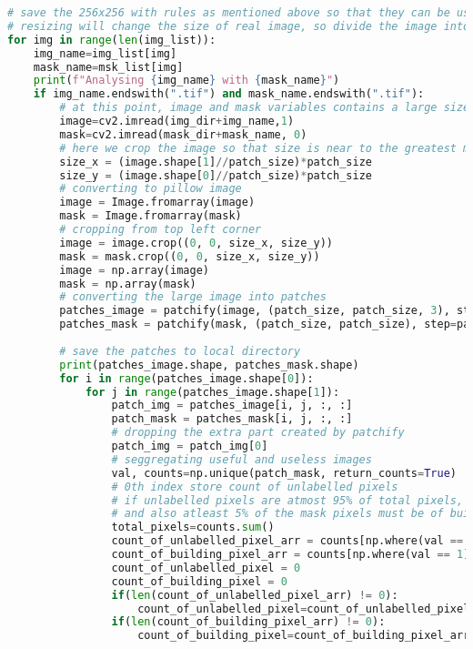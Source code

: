 \begin{lstlisting}[language=Python]
# save the 256x256 with rules as mentioned above so that they can be used for data augumentation
# resizing will change the size of real image, so divide the image into patches of 256x256x3
for img in range(len(img_list)):
    img_name=img_list[img]
    mask_name=msk_list[img]
    print(f"Analysing {img_name} with {mask_name}")
    if img_name.endswith(".tif") and mask_name.endswith(".tif"):
        # at this point, image and mask variables contains a large sized images
        image=cv2.imread(img_dir+img_name,1)
        mask=cv2.imread(mask_dir+mask_name, 0)
        # here we crop the image so that size is near to the greatest multiple of 256
        size_x = (image.shape[1]//patch_size)*patch_size
        size_y = (image.shape[0]//patch_size)*patch_size
        # converting to pillow image
        image = Image.fromarray(image)
        mask = Image.fromarray(mask)
        # cropping from top left corner
        image = image.crop((0, 0, size_x, size_y))
        mask = mask.crop((0, 0, size_x, size_y))
        image = np.array(image)
        mask = np.array(mask)
        # converting the large image into patches
        patches_image = patchify(image, (patch_size, patch_size, 3), step=patch_size)
        patches_mask = patchify(mask, (patch_size, patch_size), step=patch_size)
        
        # save the patches to local directory
        print(patches_image.shape, patches_mask.shape)
        for i in range(patches_image.shape[0]):
            for j in range(patches_image.shape[1]):
                patch_img = patches_image[i, j, :, :]
                patch_mask = patches_mask[i, j, :, :]
                # dropping the extra part created by patchify
                patch_img = patch_img[0]
                # seggregating useful and useless images
                val, counts=np.unique(patch_mask, return_counts=True)
                # 0th index store count of unlabelled pixels
                # if unlabelled pixels are atmost 95% of total pixels, then we have atleast 5% useful pixels.
                # and also atleast 5% of the mask pixels must be of building class.
                total_pixels=counts.sum()
                count_of_unlabelled_pixel_arr = counts[np.where(val == 0)[0]]
                count_of_building_pixel_arr = counts[np.where(val == 1)[0]]
                count_of_unlabelled_pixel = 0
                count_of_building_pixel = 0
                if(len(count_of_unlabelled_pixel_arr) != 0):
                    count_of_unlabelled_pixel=count_of_unlabelled_pixel_arr[0]
                if(len(count_of_building_pixel_arr) != 0):
                    count_of_building_pixel=count_of_building_pixel_arr[0]


\end{lstlisting}
